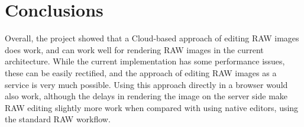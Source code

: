 \documentclass[11pt,a4paper]{article}
\begin{document}
\section{Conclusions}
Overall, the project showed that a Cloud-based approach of editing RAW images does work, and can work well for rendering RAW images in the current architecture.
While the current implementation has some performance issues, these can be easily rectified, and the approach of editing RAW images as a service is very much possible.
Using this approach directly in a browser would also work, although the delays in rendering the image on the server side make RAW editing slightly more work when compared with
using native editors, using the standard RAW workflow.

\end{document}
